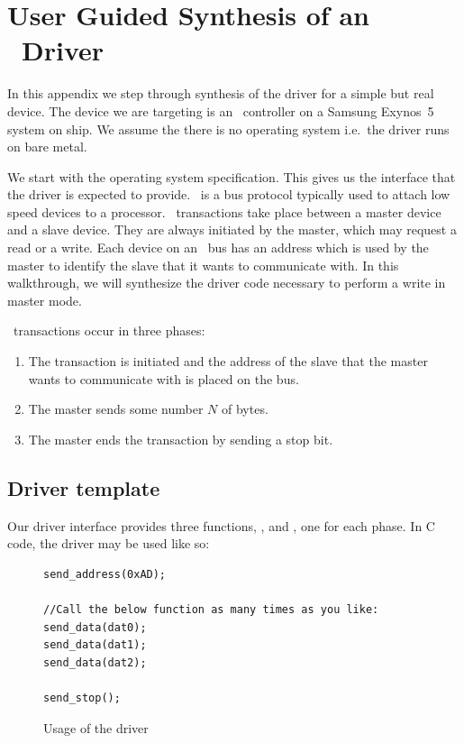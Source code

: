 \chapter{User Guided Synthesis of an \iic\ Driver}
\label{ch:worked_example}

In this appendix we step through synthesis of the driver for a simple but real device. The device we are targeting is an \iic\ controller on a Samsung Exynos~5 system on ship. We assume the there is no operating system i.e.\ the driver runs on bare metal.

We start with the operating system specification. This gives us the interface that the driver is expected to provide. \iic\ is a bus protocol typically used to attach low speed devices to a processor. \iic\ transactions take place between a master device and a slave device. They are always initiated by the master, which may request a read or a write. Each device on an \iic\ bus has an address which is used by the master to identify the slave that it wants to communicate with. In this walkthrough, we will synthesize the driver code necessary to perform a write in master mode. 

\iic\ transactions occur in three phases:
\begin{enumerate}
    \item The transaction is initiated and the address of the slave that the master wants to communicate with is placed on the bus.
    \item The master sends some number $N$ of bytes.
    \item The master ends the transaction by sending a stop bit.
\end{enumerate}

\section{Driver template}

Our driver interface provides three functions, ,  and , one for each phase. In C code, the driver may be used like so:
\begin{figure}
\caption{Usage of the \iic driver}
\label{fig:iic_usage}
\begin{lstlisting}[frame=single]
send_address(0xAD);

//Call the below function as many times as you like:
send_data(dat0);
send_data(dat1);
send_data(dat2);

send_stop();
\end{lstlisting}
\end{figure}

